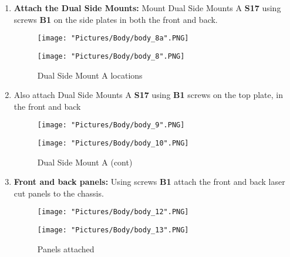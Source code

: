 \documentclass[12pt]{article}
\begin{document}
\begin{enumerate}

\item \textbf{Attach the Dual Side Mounts:} Mount Dual Side Mounts A \textbf{S17} using screws \textbf{B1} on the side plates in both the front and back. 

\begin{figure}[H]
  \centering
  \begin{minipage}[b]{0.45\textwidth}
    \texttt{[image: "Pictures/Body/body\_8a".PNG]}
  \end{minipage}
  \hfill
  \begin{minipage}[b]{0.45\textwidth}
    \texttt{[image: "Pictures/Body/body\_8".PNG]}
  \end{minipage}
  \caption{Dual Side Mount A locations}
  \label{Dual Side Mounts}
\end{figure}

\item Also attach Dual Side Mounts A \textbf{S17} using \textbf{B1} screws on the top plate, in the front and back

\begin{figure}[H]
  \centering
  \begin{minipage}[b]{0.45\textwidth}
    \texttt{[image: "Pictures/Body/body\_9".PNG]}
  \end{minipage}
  \hfill
  \begin{minipage}[b]{0.45\textwidth}
    \texttt{[image: "Pictures/Body/body\_10".PNG]}
  \end{minipage}
  \caption{Dual Side Mount A (cont)}
  \label{Dual Side Mounts_cont}
\end{figure}


\item \textbf{Front and back panels:} Using screws \textbf{B1} attach the front and back laser cut panels to the chassis. 

\begin{figure}[H]
  \centering
  \begin{minipage}[b]{0.45\textwidth}
    \texttt{[image: "Pictures/Body/body\_12".PNG]}
  \end{minipage}
  \hfill
  \begin{minipage}[b]{0.45\textwidth}
    \texttt{[image: "Pictures/Body/body\_13".PNG]}
  \end{minipage}
  \caption{Panels attached}
  \label{finished body}
\end{figure}



\end{enumerate}
\end{document}
